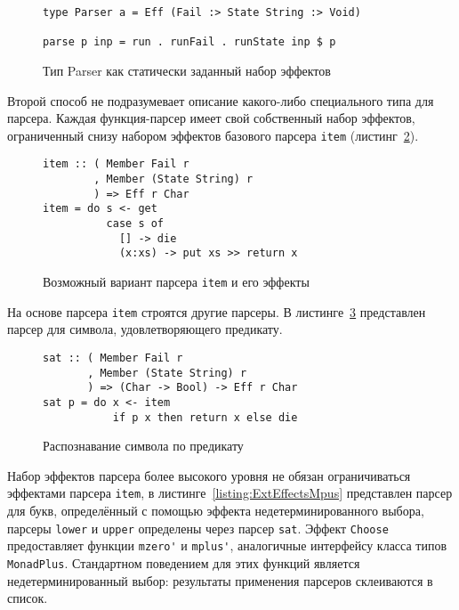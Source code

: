 \begin{figure}[h]
\begin{lstlisting}
type Parser a = Eff (Fail :> State String :> Void)

parse p inp = run . runFail . runState inp $ p
\end{lstlisting}
\caption{Тип Parser как статически заданный набор эффектов}
\label{listing:ExtEffectsParser}
\end{figure}

Второй способ не подразумевает описание какого-либо специального типа для 
парсера. Каждая функция-парсер имеет свой собственный набор эффектов, 
ограниченный снизу набором эффектов базового парсера \lstinline{item} 
(листинг~\ref{listing:ExtEffectsItem}).

\begin{figure}[h]
\begin{lstlisting}
item :: ( Member Fail r
        , Member (State String) r
        ) => Eff r Char
item = do s <- get
          case s of
            [] -> die
            (x:xs) -> put xs >> return x
\end{lstlisting}
\caption{Возможный вариант парсера \lstinline{item} и его эффекты}
\label{listing:ExtEffectsItem}
\end{figure}

На основе парсера \lstinline{item} строятся другие парсеры. 
В листинге~\ref{listing:ExtEffectsSat} представлен парсер для символа, 
удовлетворяющего предикату.

\begin{figure}[h]
\begin{lstlisting}
sat :: ( Member Fail r
       , Member (State String) r
       ) => (Char -> Bool) -> Eff r Char
sat p = do x <- item
           if p x then return x else die
\end{lstlisting}
\caption{Распознавание символа по предикату}
\label{listing:ExtEffectsSat}
\end{figure}

Набор эффектов парсера более высокого уровня не обязан ограничиваться эффектами
парсера \lstinline{item}, в листинге~\ref{listing:ExtEffectsMpus} представлен
парсер для букв, определённый с помощью эффекта недетерминированного выбора,
парсеры \lstinline{lower} и \lstinline{upper} определены через парсер
\lstinline{sat}. Эффект \lstinline{Choose} предоставляет функции
\lstinline{mzero'} и \lstinline{mplus'}, аналогичные интерфейсу класса типов
\lstinline{MonadPlus}. Стандартном поведением для этих функций является
недетерминированный выбор: результаты применения парсеров склеиваются в список.

